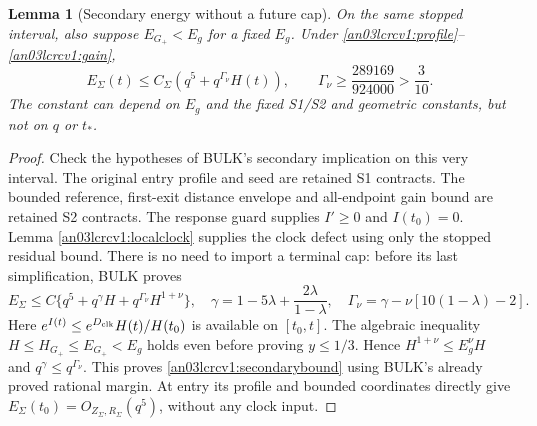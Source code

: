 \documentclass[11pt]{article}
\newtheorem{lemma}[theorem]{Lemma}
\theoremstyle{remark}\newtheorem{remark}[theorem]{Remark}
\newcommand{\Gp}{G_+}
\begin{document}
\begin{lemma}[Secondary energy without a future cap]
\label{an03lcrcv1:secondary}
On the same stopped interval, also suppose $E_{\Gp}<E_g$ for a
fixed $E_g$. Under \eqref{an03lcrcv1:profile}--\eqref{an03lcrcv1:gain},
\begin{equation}\label{an03lcrcv1:secondarybound}
 E_\Sigma(t)\le C_\Sigma(q^5+q^{\Gamma_\nu}H(t)),\qquad
 \Gamma_\nu\ge\frac{289169}{924000}>\frac3{10}.
\end{equation}
The constant can depend on $E_g$ and the fixed S1/S2 and geometric
constants, but not on $q$ or $t_*$.
\end{lemma}
\begin{proof}
Check the hypotheses of BULK's secondary implication on this very
interval. The original entry profile and seed are retained S1
contracts. The bounded reference, first-exit distance envelope and
all-endpoint gain bound are retained S2 contracts. The response
guard supplies $I'\ge0$ and $I(t_0)=0$. Lemma
\ref{an03lcrcv1:localclock} supplies the clock defect using only the
stopped residual bound. There is no need to import a terminal cap:
before its last simplification, BULK proves
\[
 E_\Sigma\le C\{q^5+q^\gamma H+q^{\Gamma_\nu}H^{1+\nu}\},
 \quad \gamma=1-5\lambda+\frac{2\lambda}{1-\lambda},
 \quad \Gamma_\nu=\gamma-\nu[10(1-\lambda)-2].
\]
Here $e^{I(t)}\le e^{D_{\rm clk}}H(t)/H(t_0)$ is available on
$[t_0,t]$. The algebraic inequality
$H\le H_{\Gp}\le E_{\Gp}<E_g$ holds even before proving
$y\le1/3$. Hence $H^{1+\nu}\le E_g^\nu H$ and
$q^\gamma\le q^{\Gamma_\nu}$. This proves
\eqref{an03lcrcv1:secondarybound} using BULK's already proved rational
margin. At entry its profile and bounded coordinates directly give
$E_\Sigma(t_0)=O_{Z_\Sigma,R_\Sigma}(q^5)$, without any clock input.
\end{proof}
\end{document}
